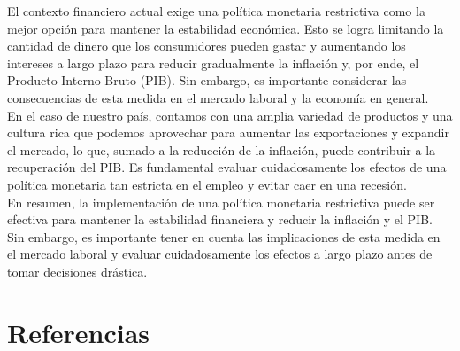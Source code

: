 \documentclass{article}
\theoremstyle{mytheoremstyle}
\theoremstyle{mytheoremstyle}
\theoremstyle{myproblemstyle}
\begin{document}
El contexto financiero actual exige una política monetaria restrictiva como la mejor opción para mantener la estabilidad económica. Esto se logra limitando la cantidad de dinero que los consumidores pueden gastar y aumentando los intereses a largo plazo para reducir gradualmente la inflación y, por ende, el Producto Interno Bruto (PIB). Sin embargo, es importante considerar las consecuencias de esta medida en el mercado laboral y la economía en general.\\

En el caso de nuestro país, contamos con una amplia variedad de productos y una cultura rica que podemos aprovechar para aumentar las exportaciones y expandir el mercado, lo que, sumado a la reducción de la inflación, puede contribuir a la recuperación del PIB. Es fundamental evaluar cuidadosamente los efectos de una política monetaria tan estricta en el empleo y evitar caer en una recesión.\\

En resumen, la implementación de una política monetaria restrictiva puede ser efectiva para mantener la estabilidad financiera y reducir la inflación y el PIB. Sin embargo, es importante tener en cuenta las implicaciones de esta medida en el mercado laboral y evaluar cuidadosamente los efectos a largo plazo antes de tomar decisiones drástica.\\

\section{Referencias}
\end{document}
